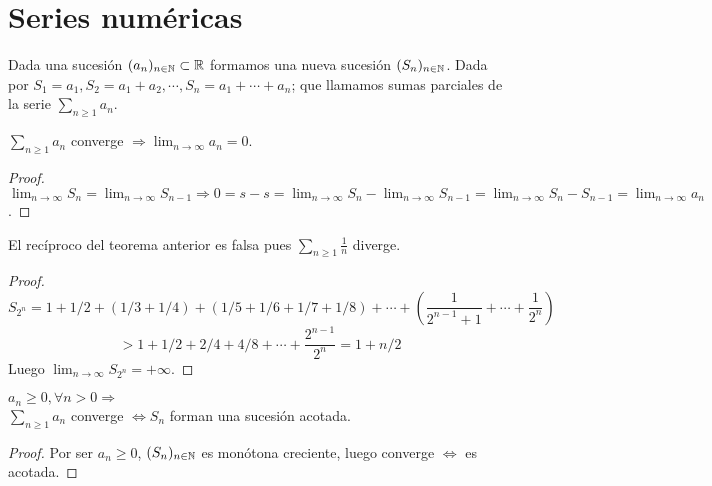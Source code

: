 \section{Series numéricas}

Dada una sucesión $(a_n)_{n \in \mathbb{N}} \subset \mathbb{R}$ formamos una nueva sucesión $(S_n)_{n \in \mathbb{N}}$. Dada por $S_1 = a_1, S_2 = a_1 + a_2, \cdots, S_n = a_1 + \cdots + a_n$; que llamamos sumas parciales de la serie $\sum_{n \geq 1} a_n$.


\begin{theorem}
  $\sum_{n \geq 1} a_n$ converge $\Rightarrow \lim_{n \to \infty} a_n = 0$.
  \begin{proof}
    $\lim_{n \to \infty} S_n = \lim_{n \to \infty} S_{n-1} \Rightarrow 0 = s - s = \lim_{n \to \infty} S_n - \lim_{n \to \infty} S_{n-1} = \lim_{n \to \infty} S_n - S_{n-1} = \lim_{n \to \infty} a_n$.
  \end{proof}
\end{theorem}

\begin{eg}
  El recíproco del teorema anterior es falsa pues $\sum_{n \geq 1} \frac{1}{n}$ diverge.
  \begin{proof}
    \begin{equation}
      S_{2^n} = 1 + 1/2 + (1/3 + 1/4) + (1/5 + 1/6 + 1/7 + 1/8) + \cdots + (\frac{1}{2^{n-1}+1} + \cdots + \frac{1}{2^n})
    \end{equation}
    \begin{equation}
      > 1 + 1/2 + 2/4 + 4/8 + \cdots + \frac{2^{n-1}}{2^n} = 1 + n/2
    \end{equation}
    Luego $\lim_{n \to \infty} S_{2^n} = + \infty$.
  \end{proof}
\end{eg}

\begin{theorem}
  $a_n \geq 0, \forall n > 0 \Rightarrow$ \\
  $\sum_{n \geq 1} a_n$ converge $\iff S_n$ forman una sucesión acotada.
  \begin{proof}
    Por ser $a_n \geq 0$, $(S_n)_{n \in \mathbb{N}}$ es monótona creciente, luego converge $\iff$ es acotada.
  \end{proof}
\end{theorem}

